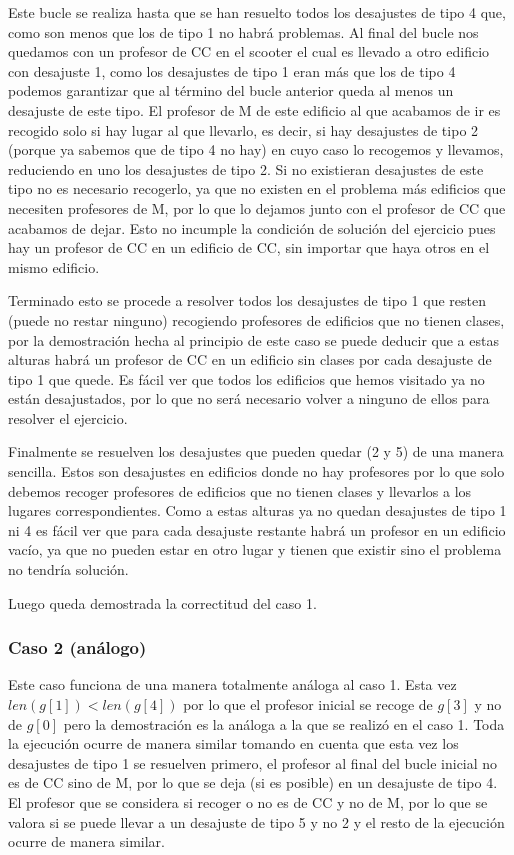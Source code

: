 \documentclass[11pt]{article}
\begin{document}
    Este bucle se realiza hasta que se han resuelto todos los desajustes de tipo 4 que, como son menos que los de tipo 1 no habrá
    problemas. Al final del bucle nos quedamos con un profesor de CC en el scooter el cual es llevado a otro edificio con desajuste
    1, como los desajustes de tipo 1 eran más que los de tipo 4 podemos garantizar que al término del bucle anterior queda al menos
    un desajuste de este tipo. El profesor de M de este edificio al que acabamos de ir es recogido solo si hay lugar al que llevarlo,
    es decir, si hay desajustes de tipo 2 (porque ya sabemos que de tipo 4 no hay) en cuyo caso lo recogemos y llevamos, reduciendo
    en uno los desajustes de tipo 2. Si no existieran desajustes de este tipo no es necesario recogerlo, ya que no existen en el problema
    más edificios que necesiten profesores de M, por lo que lo dejamos junto con el profesor de CC que acabamos de dejar. Esto no incumple
    la condición de solución del ejercicio pues hay un profesor de CC en un edificio de CC, sin importar que haya otros en el mismo edificio.

    Terminado esto se procede a resolver todos los desajustes de tipo 1 que resten (puede no restar ninguno) recogiendo profesores de edificios
    que no tienen clases, por la demostración hecha al principio de este caso se puede deducir que a estas alturas habrá un profesor de CC en un
    edificio sin clases por cada desajuste de tipo 1 que quede. Es fácil ver que todos los edificios que hemos visitado ya no están desajustados,
    por lo que no será necesario volver a ninguno de ellos para resolver el ejercicio.

    Finalmente se resuelven los desajustes que pueden quedar (2 y 5) de una manera sencilla. Estos son desajustes en
    edificios donde no hay profesores por lo que solo debemos recoger profesores de edificios que no tienen clases y
    llevarlos a los lugares correspondientes. Como a estas alturas ya no quedan desajustes de tipo 1 ni 4 es fácil ver
    que para cada desajuste restante habrá un profesor en un edificio vacío, ya que no pueden estar en otro lugar y tienen
    que existir sino el problema no tendría solución.

    Luego queda demostrada la correctitud del caso 1.

    \subsubsection{Caso 2 (análogo)}
    Este caso funciona de una manera totalmente análoga al caso 1. Esta vez $len(g[1]) < len(g[4])$ por lo que el profesor
    inicial se recoge de $g[3]$ y no de $g[0]$ pero la demostración es la análoga a la que se realizó en el caso 1.
    Toda la ejecución ocurre de manera similar tomando en cuenta que esta vez los desajustes de tipo 1 se resuelven primero,
    el profesor al final del bucle inicial no es de CC sino de M, por lo que se deja (si es posible) en un desajuste de tipo 4.
    El profesor que se considera si recoger o no es de CC y no de M, por lo que se valora si se puede llevar a un desajuste
    de tipo 5 y no 2 y el resto de la ejecución ocurre de manera similar.
\end{document}
